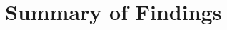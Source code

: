\chapter{Summary of Findings}
\renewcommand{\ReportBoolWriteSummary}{true}
\IfFileExists{\ReportSummaryFile}{}{}
\renewcommand{\ReportBoolWriteSummary}{false}